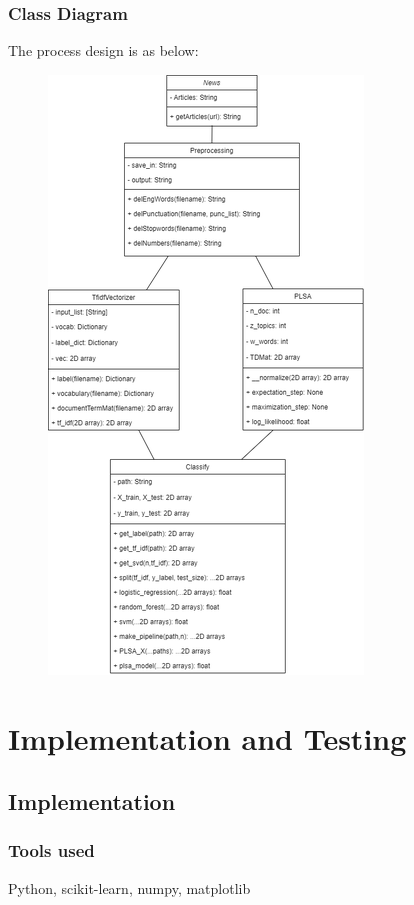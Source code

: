 \documentclass[12pt]{report}
\begin{document}
        \subsection{Class Diagram}
        The process design is as below:
        \begin{figure}[h]
            \centering
            \includegraphics[scale=0.85]{class_diagram.png}
        \end{figure}

        \chapter{Implementation and Testing}
        
        \section{Implementation}
        \subsection{Tools used} Python, scikit-learn, numpy, matplotlib
\end{document}
